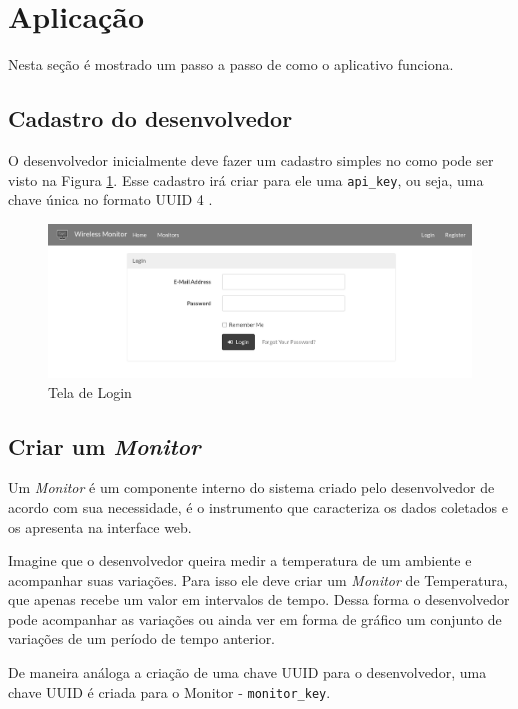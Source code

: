 \section{Aplicação}\label{aplicauxe7uxe3o}

Nesta seção é mostrado um passo a passo de como o aplicativo funciona.

\subsection{Cadastro do desenvolvedor}\label{cadastro-do-desenvolvedor}

O desenvolvedor inicialmente deve fazer um cadastro simples no \wm
como pode ser visto na Figura \ref{fig:login-screen}. Esse cadastro irá
criar para ele uma \texttt{api\_key}, ou seja, uma chave única no
formato UUID 4 \cite{rfc4122:2005}.

\begin{figure}[h]
    \centering
    \includegraphics[scale=0.35]{img/login-screen-grey.png}
    \caption{Tela de Login} \label{fig:login-screen}
\end{figure}

\subsection{Criar um \emph{Monitor}}\label{criar-um-monitor}

Um \emph{Monitor} é um componente interno do sistema criado pelo
desenvolvedor de acordo com sua necessidade, é o instrumento que
caracteriza os dados coletados e os apresenta na interface web.

Imagine que o desenvolvedor queira medir a temperatura de um ambiente e
acompanhar suas variações. Para isso ele deve criar um \emph{Monitor} de
Temperatura, que apenas recebe um valor em intervalos de tempo. Dessa
forma o desenvolvedor pode acompanhar as variações ou ainda ver em forma
de gráfico um conjunto de variações de um período de tempo anterior.

De maneira análoga a criação de uma chave UUID para o desenvolvedor, uma
chave UUID é criada para o Monitor - \texttt{monitor\_key}.

